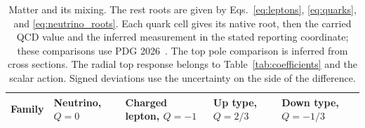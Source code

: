 \documentclass[aps,prx,reprint,longbibliography]{revtex4-2}
\begin{document}
\normalsize
\renewcommand{\arraystretch}{1}
\twocolumngrid
\begin{table}[!t]
\centering
\small
\setlength{\tabcolsep}{3pt}
\renewcommand{\arraystretch}{1.2}
\caption{\label{tab:matter}Matter and its mixing. The rest roots are given by Eqs.~\eqref{eq:leptons}, \eqref{eq:quarks}, and \eqref{eq:neutrino_roots}. Each quark cell gives its native root, then the carried QCD value and the inferred measurement in the stated reporting coordinate; these comparisons use PDG 2026~\cite{PDG}. The top pole comparison is inferred from cross sections. The radial top response belongs to Table~\ref{tab:coefficients} and the scalar action. Signed deviations use the uncertainty on the side of the difference.}
\begin{tabular}{@{}L{.07\textwidth}L{.22\textwidth}L{.22\textwidth}L{.22\textwidth}L{.22\textwidth}@{}}
\toprule
Family & Neutrino, $Q=0$ & Charged lepton, $Q=-1$ & Up type, $Q=2/3$ & Down type, $Q=-1/3$\\
\midrule


\end{tabular}
\end{table}
\end{document}
